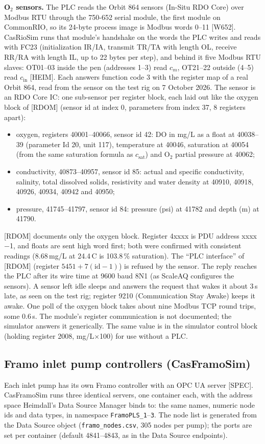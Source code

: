 \documentclass[11pt]{article}
\begin{document}
\textbf{O$_2$ sensors.} The PLC reads the Orbit 864 sensors (In-Situ RDO Core) over Modbus RTU
through the 750-652 serial module, the first module on CommonRIO, so its 24-byte process image is
Modbus words 0--11 [W652]. CasRioSim runs that module's handshake on the words the PLC writes and
reads with FC23 (initialization IR/IA, transmit TR/TA with length OL, receive RR/RA with length
IL, up to 22 bytes per step), and behind it five Modbus RTU slaves: OT01--03 inside the pen
(addresses 1--3) read $c_m$, OT21--22 outside (4--5) read $c_\text{in}$ [HEIM]. Each answers
function code 3 with the register map of a real Orbit 864, read from the sensor on the test rig on
7 October 2026. The sensor is an RDO Core IC: one sub-sensor per register block, each laid out like
the oxygen block of [RDOM] (sensor id at index 0, parameters from index 37, 8 registers apart):
\begin{itemize}
  \item oxygen, registers 40001--40066, sensor id 42: DO in mg/L as a float at 40038--39
        (parameter Id 20, unit 117), temperature at 40046, saturation at 40054 (from the same
        saturation formula as $c_\text{sat}$) and O$_2$ partial pressure at 40062;
  \item conductivity, 40873--40957, sensor id 85: actual and specific conductivity, salinity,
        total dissolved solids, resistivity and water density at 40910, 40918, 40926, 40934,
        40942 and 40950;
  \item pressure, 41745--41797, sensor id 84: pressure (psi) at 41782 and depth (m) at 41790.
\end{itemize}
[RDOM] documents only the oxygen block. Register 4xxxx is PDU address xxxx$-$1, and floats are
sent high word first; both were confirmed with consistent readings (8.68\,mg/L at 24.4\,\textdegree C
is 103.8\,\% saturation). The ``PLC interface'' of [RDOM] (register $5451 + 7(\text{id}-1)$) is
refused by the sensor. The reply reaches the PLC after
its wire time at 9600 baud 8N1 (as ScaleAQ configures the sensors). A sensor left idle sleeps and answers the request that wakes it about 3\,s late, as seen on the test rig; register 9210 (Communication Stay Awake) keeps it awake. One poll of the oxygen block takes about nine Modbus TCP round
trips, some 0.6\,s. The module's register communication is not documented; the simulator answers it generically. The same value is in the
simulator control block (holding register 2008, mg/L$\times$100) for use without a PLC.

\subsection{Framo inlet pump controllers (CasFramoSim)}\label{sec:framo}
Each inlet pump has its own Framo controller with an OPC UA server [SPEC]. CasFramoSim runs three
identical servers, one container each, with the address space Heimdall's Data Source Manager
binds to: the same names, numeric node ids and data types, in namespace
\texttt{FramoPLS\_1}--\texttt{3}. The node list is generated from the Data Source object
(\texttt{framo\_nodes.csv}, 305 nodes per pump); the ports are set per container (default
4841--4843, as in the Data Source endpoints).
\end{document}
